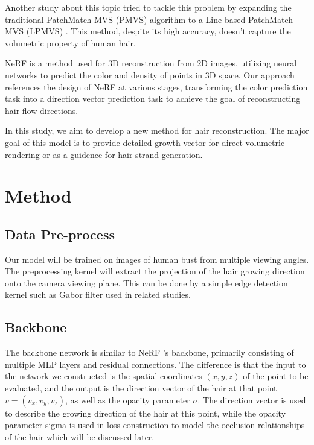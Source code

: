 \documentclass[12pt]{article}
\begin{document}
  Another study about this topic tried to tackle this problem by expanding the traditional PatchMatch MVS (PMVS) algorithm to a Line-based PatchMatch MVS (LPMVS) \cite{nam_strand-accurate_nodate}. This method, despite its high accuracy, doesn't capture the volumetric property of human hair.

  NeRF \cite{mildenhall_nerf_2020} is a method used for 3D reconstruction from 2D images, utilizing neural networks to predict the color and density of points in 3D space. Our approach references the design of NeRF at various stages, transforming the color prediction task into a direction vector prediction task to achieve the goal of reconstructing hair flow directions.

  In this study, we aim to develop a new method for hair reconstruction. The major goal of this model is to provide detailed growth vector for direct volumetric rendering or as a guidence for hair strand generation.

  \section{Method}
    \subsection{Data Pre-process}

    Our model will be trained on images of human bust from multiple viewing angles. The preprocessing kernel will extract the projection of the hair growing direction onto the camera viewing plane. This can be done by a simple edge detection kernel such as Gabor filter used in related studies.
    
    \subsection{Backbone}
    
    The backbone network is similar to NeRF \cite{mildenhall_nerf_2020}'s backbone, primarily consisting of multiple MLP layers and residual connections. The difference is that the input to the network we constructed is the spatial coordinates $(x, y, z)$ of the point to be evaluated, and the output is the direction vector of the hair at that point $v = (v_x, v_y, v_z)$, as well as the opacity parameter $\sigma$. The direction vector is used to describe the growing direction of the hair at this point, while the opacity parameter sigma is used in loss construction to model the occlusion relationships of the hair which will be discussed later.
    
\end{document}
